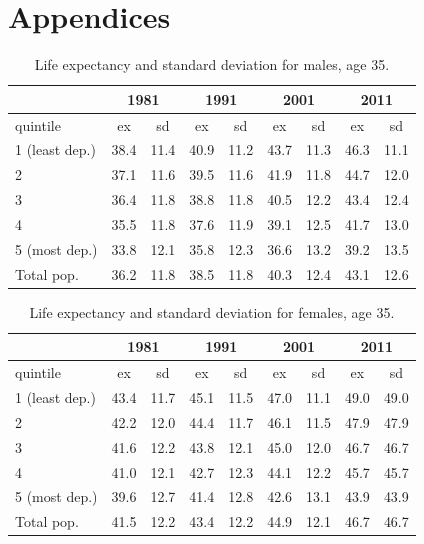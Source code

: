 \documentclass[12pt,oneside,a4paper]{article} %
\theoremstyle{definition}
\begin{document}
\section{Appendices}
\begin{table}[htbp]
  \centering
  \caption{Life expectancy and standard deviation for males, age 35.}
    \begin{tabular}{lrrrrrrrr}
          & \multicolumn{2}{c}{1981} & \multicolumn{2}{c}{1991} & \multicolumn{2}{c}{2001} & \multicolumn{2}{c}{2011} \\
    \midrule
    quintile & \multicolumn{1}{c}{ex} & \multicolumn{1}{c}{sd} & \multicolumn{1}{c}{ex} & \multicolumn{1}{c}{sd} & \multicolumn{1}{c}{ex} & \multicolumn{1}{c}{sd} & \multicolumn{1}{c}{ex} & \multicolumn{1}{c}{sd} \\
    \midrule
    1 (least dep.) & 38.4  & 11.4  & 40.9  & 11.2  & 43.7  & 11.3  & 46.3  & 11.1 \\
    2     & 37.1  & 11.6  & 39.5  & 11.6  & 41.9  & 11.8  & 44.7  & 12.0 \\
    3     & 36.4  & 11.8  & 38.8  & 11.8  & 40.5  & 12.2  & 43.4  & 12.4 \\
    4     & 35.5  & 11.8  & 37.6  & 11.9  & 39.1  & 12.5  & 41.7  & 13.0 \\
    5 (most dep.) & 33.8  & 12.1  & 35.8  & 12.3  & 36.6  & 13.2  & 39.2  & 13.5 \\
    Total pop. & 36.2  & 11.8  & 38.5  & 11.8  & 40.3  & 12.4  & 43.1  & 12.6 \\
    \bottomrule
    \end{tabular}%
  \label{tab:addlabel}%
\end{table}%


\begin{table}[htbp]
  \centering
  \caption{Life expectancy and standard deviation for females, age 35.}
    \begin{tabular}{lrrrrrrrr}
          & \multicolumn{2}{c}{1981} & \multicolumn{2}{c}{1991} & \multicolumn{2}{c}{2001} & \multicolumn{2}{c}{2011} \\
    \midrule
    quintile & \multicolumn{1}{c}{ex} & \multicolumn{1}{c}{sd} & \multicolumn{1}{c}{ex} & \multicolumn{1}{c}{sd} & \multicolumn{1}{c}{ex} & \multicolumn{1}{c}{sd} & \multicolumn{1}{c}{ex} & \multicolumn{1}{c}{sd} \\
    \midrule
    1 (least dep.) & 43.4  & 11.7  & 45.1  & 11.5  & 47.0  & 11.1  & 49.0  & 49.0 \\
    2     & 42.2  & 12.0  & 44.4  & 11.7  & 46.1  & 11.5  & 47.9  & 47.9 \\
    3     & 41.6  & 12.2  & 43.8  & 12.1  & 45.0  & 12.0  & 46.7  & 46.7 \\
    4     & 41.0  & 12.1  & 42.7  & 12.3  & 44.1  & 12.2  & 45.7  & 45.7 \\
    5 (most dep.) & 39.6  & 12.7  & 41.4  & 12.8  & 42.6  & 13.1  & 43.9  & 43.9 \\
    Total pop. & 41.5  & 12.2  & 43.4  & 12.2  & 44.9  & 12.1  & 46.7  & 46.7 \\
    \bottomrule
    \end{tabular}%
  \label{tab:addlabel}%
\end{table}%
\end{document}
